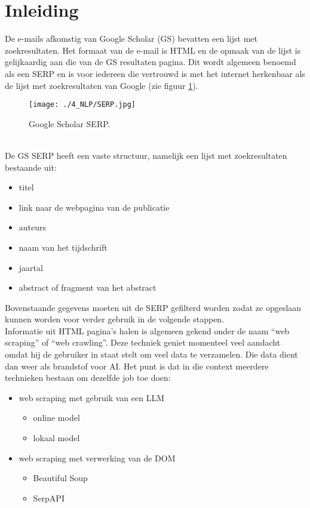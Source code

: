 \section{Inleiding}
De e-mails afkomstig van Google Scholar (GS) bevatten een lijst met zoekresultaten. Het formaat van de e-mail is HTML en de opmaak van de lijst is gelijkaardig aan die van de GS resultaten pagina. Dit wordt algemeen benoemd als een SERP en is voor iedereen die vertrouwd is met het internet herkenbaar als de lijst met zoekresultaten van Google (zie figuur \ref{fig:Google_Scholar_SERP}).
\begin{figure}
    \centering
    \texttt{[image: ./4\_NLP/SERP.jpg]}
    \caption[Google Scholar SERP.]{\label{fig:Google_Scholar_SERP}Google Scholar SERP.}
\end{figure}\\
De GS SERP heeft een vaste structuur, namelijk een lijst met zoekresultaten bestaande uit:
\begin{itemize}
    \item titel
    \item link naar de webpagina van de publicatie
    \item auteurs
    \item naam van het tijdschrift
    \item jaartal
    \item abstract of fragment van het abstract
\end{itemize} 
Bovenstaande gegevens moeten uit de SERP gefilterd worden zodat ze opgeslaan kunnen worden voor verder gebruik in de volgende stappen.\\
Informatie uit HTML pagina's halen is algemeen gekend onder de naam ``web scraping'' of  ``web crawling''. Deze techniek geniet momenteel veel aandacht omdat hij de gebruiker in staat stelt om veel data te verzamelen. Die data dient dan weer als brandstof voor AI. Het punt is dat in die context meerdere technieken bestaan om dezelfde job toe doen:
\begin{itemize}
    \item web scraping met gebruik van een LLM
    \begin{itemize}
        \item online model
        \item lokaal model
    \end{itemize}
    \item web scraping met verwerking van de DOM
    \begin{itemize}
        \item Beautiful Soup
        \item SerpAPI
    \end{itemize}
\end{itemize} 

